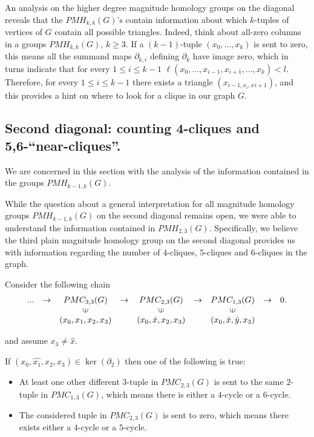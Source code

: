 \documentclass{article}
\newcommand{\vin}{\rotatebox[origin=c]{90}{$\in$}}
\begin{document}
	
	An analysis on the higher degree magnitude homology groups on the diagonal reveals that the $PMH_{k,k}(G)$'s contain information about which $k$-tuples of vertices of $G$ contain all possible triangles. 
	Indeed, think about all-zero columns in a groups $PMH_{k,k}(G)$, $k \geq 3$.
	If a $(k-1)$-tuple $(x_0,\dots,x_k)$ is sent to zero, this means all the summand maps $\partial_{k,i}$ defining $\partial_k$ have image zero, which in turns indicate that for every $1\leq i \leq k-1$ $\ell(x_0,\dots,x_{i-1},x_{i+1},\dots,x_k)<l$.
	Therefore, for every $1\leq i \leq k-1$ there exists a triangle $(x_{i-1,x_i,x_{}i+1})$, and this provides a hint on where to look for a clique in our graph $G$.
	
	\subsection{Second diagonal: counting 4-cliques and 5,6-``near-cliques''.}
	
	We are concerned in this section with the analysis of the information contained in the groups $PMH_{k-1,k}(G)$.
	
	While the question about a general interpretation for all magnitude homology groups $PMH_{k-1,k}(G)$ on the second diagonal remains open, we were able to understand the information contained in $PMH_{2,3}(G)$.
	Specifically, we believe the third plain magnitude homology group on the second diagonal provides us with information regarding the number of $4$-cliques, $5$-cliques and $6$-cliques in the graph.
	
	Consider the following chain
	\begin{equation*}
		\begin{matrix}
			... &\to & PMC_{3,3}(G)      &\to & PMC_{2,3}(G)            &\to & PMC_{1,3}(G) &\to & 0. \\
			&    & \vin              &    & \vin                    &    & \vin         &    &    \\
			&    & (x_0,x_1,x_2,x_3) &    & (x_0,\hat{x},x_2,x_3) &    & (x_0,\hat{x},\hat{y},x_3) & &
		\end{matrix}
	\end{equation*}
	
	and assume $x_3 \neq \hat{x}$.
	
	If $(x_0,\hat{x_1},x_2,x_3) \in \ker(\partial_2)$ then one of the following is true:
	\begin{itemize}
		\item At least one other different $3$-tuple in $PMC_{2,3}(G)$ is sent to the same $2$-tuple in $PMC_{1,3}(G)$, which means there is either a $4$-cycle or a $6$-cycle.
		\item The considered tuple in $PMC_{2,3}(G)$ is sent to zero, which means there exists either a $4$-cycle or a $5$-cycle.
	\end{itemize}
	
\end{document}
